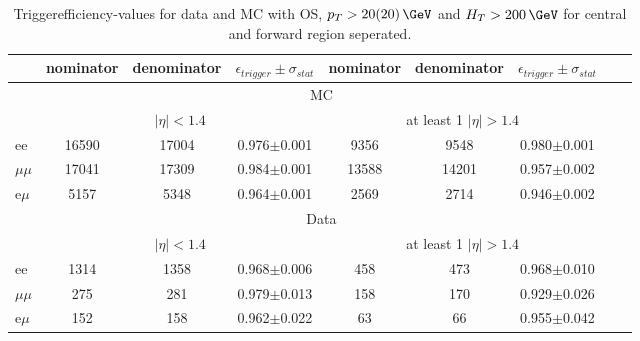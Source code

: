 
\begin{table}[hbp] \caption{Triggerefficiency-values for data and MC with OS, $p_T>20(20)\,\GeV$ and $H_T>200\,\GeV$ for central and forward region seperated.} 
\centering 
\renewcommand{\arraystretch}{1.2} 
\begin{tabular}{|l|c|c|c|c|c|c|c|c|}     
\hline    
 & nominator & denominator & $\epsilon_{trigger} \pm \sigma_{stat}$ &  nominator & denominator & $\epsilon_{trigger} \pm \sigma_{stat}$  \\    
\hline\hline
& \multicolumn{6}{|c|}{MC} \\
\hline
&  \multicolumn{3}{|c|}{$|\eta|<1.4$ } & \multicolumn{3}{|c|}{ at least 1 $|\eta| > 1.4$ } \\
\hline 
ee & 16590 & 17004 & 0.976$\pm$0.001 & 9356 & 9548 & 0.980$\pm$0.001 \\
$\mu\mu$ & 17041 & 17309 & 0.984$\pm$0.001 & 13588 & 14201 & 0.957$\pm$0.002 \\
e$\mu$ & 5157 & 5348 & 0.964$\pm$0.001 & 2569 & 2714 & 0.946$\pm$0.002 \\
    
    \hline 
&\multicolumn{6}{|c|}{Data} \\
\hline
&  \multicolumn{3}{|c|}{$|\eta|<1.4$ } & \multicolumn{3}{|c|}{ at least 1 $|\eta| > 1.4$ }\\
\hline
ee & 1314 & 1358 & 0.968$\pm$0.006 & 458 & 473 & 0.968$\pm$0.010 \\
$\mu\mu$ & 275 & 281 & 0.979$\pm$0.013 & 158 & 170 & 0.929$\pm$0.026 \\
e$\mu$ & 152 & 158 & 0.962$\pm$0.022 & 63 & 66 & 0.955$\pm$0.042 \\
 
 \hline     
\end{tabular}  
\label{tab:EffValues_Seperated}
\end{table}
